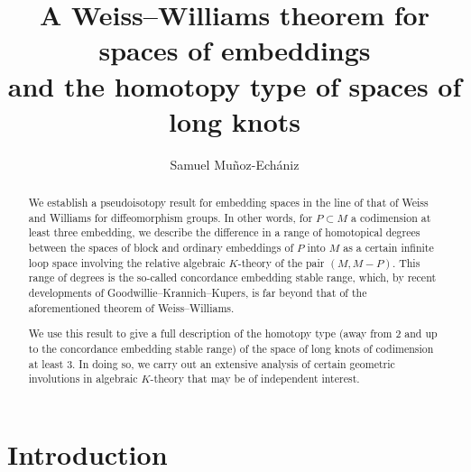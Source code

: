\documentclass[a4paper, oneside]{amsart}
\title[A Weiss--Williams theorem for spaces of embeddings and the homotopy type of spaces of long knots]{A Weiss--Williams theorem for spaces of embeddings\\ and the homotopy type of spaces of long knots}
\author{Samuel Mu\~noz-Ech\'aniz}
\newcommand{\1}{\mathds{1}}
\theoremstyle{remark}
\theoremstyle{definition}
\numberwithin{equation}{section}
\begin{document}
\begin{abstract}
We establish a pseudoisotopy result for embedding spaces in the line of that of Weiss and Williams for diffeomorphism groups. In other words, for $P\subset M$ a codimension at least three embedding, we describe the difference in a range of homotopical degrees between the spaces of block and ordinary embeddings of $P$ into $M$ as a certain infinite loop space involving the relative algebraic $K$-theory of the pair $(M,M-P)$. This range of degrees is the so-called concordance embedding stable range, which, by recent developments of Goodwillie--Krannich--Kupers, is far beyond that of the aforementioned theorem of Weiss--Williams. 

We use this result to give a full description of the homotopy type (away from 2 and up to the concordance embedding stable range) of the space of long knots of codimension at least 3. In doing so, we carry out an extensive analysis of certain geometric involutions in algebraic $K$-theory that may be of independent interest.
\end{abstract}
\maketitle

{
  \hypersetup{linkcolor=black}
  \tableofcontents
}






\section{Introduction}
\end{document}
